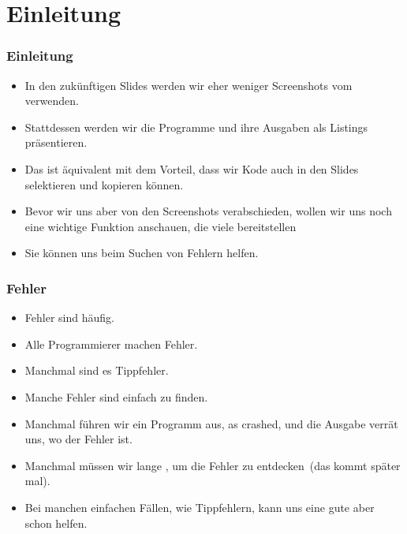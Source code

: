 \documentclass[aspectratio=169,mathserif,notheorems]{beamer}%
\subtitle{14.~Zwischenspiel:~Fehler im Kode mit Exceptions und IDE finden}%
\begin{document}
%
%
\startPresentation%
%
\section{Einleitung}%
\begin{frame}%
\frametitle{Einleitung}%
\begin{itemize}%
\item In den zukünftigen Slides werden wir eher weniger Screenshots vom \pycharm\  verwenden.%
\item<2-> Stattdessen werden wir die Programme und ihre Ausgaben als Listings präsentieren.%
\item<3-> Das ist äquivalent mit dem Vorteil, dass wir Kode auch in den Slides selektieren und kopieren können.%
\item<4-> Bevor wir uns aber von den Screenshots verabschieden, wollen wir uns noch eine wichtige Funktion anschauen, die viele  bereitstellen%
\item<5-> Sie können uns beim Suchen von Fehlern helfen.%
\end{itemize}%
\end{frame}%
%
\begin{frame}%
\frametitle{Fehler}%
\begin{itemize}%
\item Fehler sind häufig.%
\item<2-> \alert{Alle Programmierer machen Fehler.}%
\item<3-> Manchmal sind es Tippfehler.%
\item<9-> Manche Fehler sind einfach zu finden.%
\item<10-> Manchmal führen wir ein Programm aus, as crashed, und die Ausgabe verrät uns, wo der Fehler ist.
\item<11-> Manchmal müssen wir lange , um die Fehler zu entdecken~(das kommt später mal).%
\item<12-> Bei manchen einfachen Fällen, wie Tippfehlern, kann uns eine gute  aber schon helfen.%
\end{itemize}%
\end{frame}%
%
\end{document}
